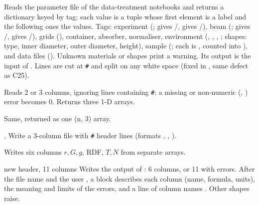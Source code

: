 \documentclass[11pt,a4paper]{article}
\begin{document}

Reads the parameter file of the data-treatment notebooks and returns a
dictionary  keyed by tag; each value is a tuple whose first
element is a label and the following ones the values. Tags: experiment
(;  gives
/,  gives /), beam
(;  gives /,
 gives /), grids (),
container, absorber, normaliser, environment (,
, , ;
shapes: type, inner diameter, outer diameter, height), sample
(;
each  is , counted into ),
and data files (). Unknown
materials or shapes print a warning. Its output is the input of
. Lines are cut at \texttt{\#} and split on any white space (fixed in , same defect as C25).


 
Reads 2 or 3 columns, ignoring lines containing \texttt{\#}; a missing or
non-numeric (, ) error becomes 0. Returns three 1-D arrays.

Same, returned as one (n, 3) array.

, 
Write a 3-column file with \texttt{\#} header lines (formats ,
, ).

Writes six columns $r, G, g$, RDF, $T, N$ from separate arrays.

 \textsf{\footnotesize\colorbox{green!15}{new header, 11 columns}}
Writes the output of : 6 columns, or 11 with errors. After
the file name and the user , a block describes each column
(name, formula, units), the meaning and limits of the errors, and a line of
column names . Other shapes raise.
\end{document}
